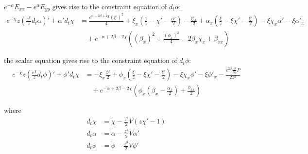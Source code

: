 \documentclass[12pt,a4paper]{article}
\numberwithin{equation}{section}
\begin{document}
$e^{-\alpha}E_{xx}-e^{\alpha}E_{yy}$ gives rise to the constraint equation of $d_t\alpha$:
\begin{equation}
    \begin{aligned}
        e^{-\chi}z \left(\frac{e^\chi}{z}d_t\alpha\right)'+\alpha'd_t\chi &= \frac{e^{\alpha- 2 \beta+2 \chi} \left(\xi'\right)^{2}}{4} + \xi_x \left(\frac{1}{z} - \chi' - \frac{\alpha'}{2}\right) - \frac{\xi'_x}{2} + \alpha_x \left(\frac{\xi}{z} - \xi \chi' - \frac{\xi'}{2}\right) - \xi \chi_x \alpha' - \xi \alpha'_x\\
        &\quad + e^{- \alpha+2 \beta- 2 \chi} \left(\left(\beta_x\right)^{2} + \frac{\left(\phi_x\right)^{2}}{4} - 2 \beta_x \chi_x + \beta_{xx}\right)
    \end{aligned}
\end{equation}

the scalar equation gives rise to the constraint equation of $d_t\phi$:
\begin{equation}
    \begin{aligned}
        e^{-\chi}z \left(\frac{e^\chi}{z}d_t\phi\right)'+\phi'd_t\chi &= - \xi_x \frac{\phi'}{2} + \phi_x \left(\frac{\xi}{z} - \xi \chi' - \frac{\xi'}{2}\right) - \xi \chi_x \phi' - \xi \phi'_x - \frac{e^{2 \beta} \frac{\partial}{\partial \phi} P}{2 z^{2}}\\
        &\quad + e^{- \alpha+2 \beta- 2 \chi} \left(\phi_x \left(\beta_x -\frac{\alpha_x}{2}\right) + \frac{\phi_{xx}}{2}\right)
    \end{aligned}
\end{equation}

where
\begin{align}
    d_t\chi&=\dot{\chi}-\frac{z^2}{2}V(z\chi'-1)\\
    d_t\alpha&=\dot{\alpha}-\frac{z^3}{2}V\alpha'\\
    d_t\phi&=\dot{\phi}-\frac{z^3}{2}V\phi'\\
\end{align}
\end{document}
